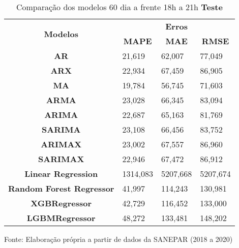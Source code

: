 \begin{table}[H]
	\centering
	\caption{Comparação dos modelos 60 dia a frente 18h a 21h \textbf{Teste} }\label{tb:60-18tst}
	\begin{tabular}{@{}clll@{}}
		\toprule
		\multirow{2}{*}{\textbf{Modelos}} & \multicolumn{3}{c}{\textbf{Erros}}                                                                       \\ \cmidrule(l){2-4} 
		& \multicolumn{1}{c}{\textbf{MAPE}} & \multicolumn{1}{c}{\textbf{MAE}} & \multicolumn{1}{c}{\textbf{RMSE}} \\ \hline
\textbf{AR}                       & 21,619                            & 62,007                           & 77,049                            \\
\textbf{ARX}                      & 22,934                            & 67,459                           & 86,905                            \\
\textbf{MA}                       & 19,784                            & 56,745                           & 71,603                            \\
\textbf{ARMA}                     & 23,028                            & 66,345                           & 83,094                            \\
\textbf{ARIMA}                    & 22,687                            & 65,163                           & 81,769                            \\
\textbf{SARIMA}                   & 23,108                            & 66,456                           & 83,752                            \\
\textbf{ARIMAX}                   & 23,002                            & 67,557                           & 86,960                            \\
\textbf{SARIMAX}                  & 22,946                            & 67,472                           & 86,912                            \\
\textbf{Linear Regression}        & 1314,083                          & 5207,668                         & 5207,674                          \\
\textbf{Random Forest Regressor}  & 41,997                            & 114,243                          & 130,981                           \\
\textbf{XGBRegressor}             & 42,729                            & 116,452                          & 133,000                           \\
\textbf{LGBMRegressor}            & 48,272                            & 133,481                          & 148,202                           \\ \bottomrule
	\end{tabular}

Fonte: Elaboração própria a partir de dados da SANEPAR (2018 a 2020)
\end{table}

